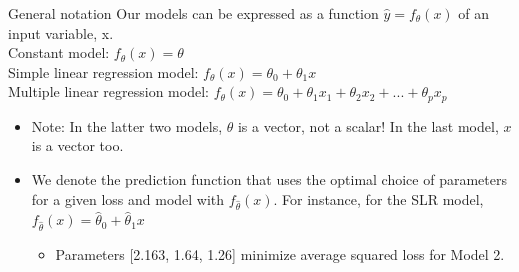 \documentclass[aspectratio=169]{../latex_main/tntbeamer}  %
\begin{document}
	
	
	\begin{frame}{General notation}
        Our models can be expressed as a function         $\hat{y} = f_\theta (x)$             of an input variable, x.\\
        Constant model: $f_\theta (x) = \theta$\\
        Simple linear regression model: $f_\theta (x) = \theta_0 + \theta_1x$\\
        Multiple linear regression model: $f_\theta (x) = \theta_0 + \theta_1x_1 + \theta_2x_2 + ... + \theta_px_p $\\
        \bigskip
        \begin{itemize}
            \item Note: In the latter two models, $\theta$ is a vector, not a scalar! In the last model, $x$ is a vector too. 
            \item We denote the prediction function that uses the optimal choice of parameters for a given loss and model with $f_\hat{\theta}(x)$. For instance, for the SLR  model, $f_\hat{\theta}(x) = \hat{\theta}_0 + \hat{\theta}_1x$                              
            \begin{itemize}
                \item Parameters [2.163, 1.64, 1.26] minimize average squared loss for Model 2.
            \end{itemize}
        \end{itemize}

	\end{frame}
\end{document}
